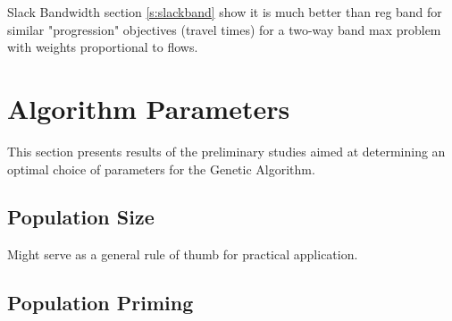 Slack Bandwidth section \ref{s:slackband} show it is much better than reg band for similar "progression" objectives (travel times) for a two-way band max problem with weights proportional to flows. 

\section{Algorithm Parameters}

This section presents results of the preliminary studies aimed at determining an optimal choice of parameters for the Genetic Algorithm.

\subsection{Population Size}


Might serve as a general rule of thumb for practical application.

\subsection{Population Priming} \label{s:poppriming}

